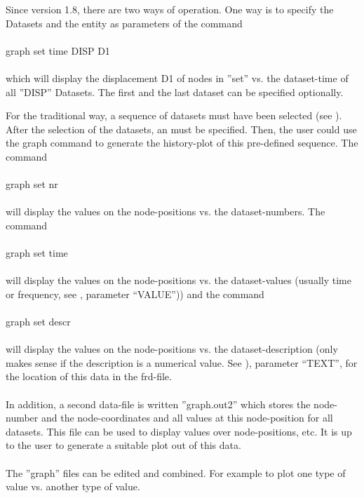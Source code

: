 \documentclass{article}
\begin{document}
Since version 1.8, there are two ways of operation. One way is to specify the Datasets and the entity as parameters of the command\\\\graph set time DISP D1\\\\which will display the displacement D1 of nodes in ''set'' vs. the dataset-time of all ''DISP'' Datasets. The first and the last dataset can be specified optionally.

For the traditional way, a sequence of datasets must have been selected (see  ). After the selection of the datasets, an  must be specified. Then, the user could use the graph command to generate the history-plot of this pre-defined sequence. The command\\\\graph set nr\\\\will display the values on the node-positions vs. the dataset-numbers. The command\\\\graph set time\\\\will display the values on the node-positions vs. the dataset-values (usually time or frequency, see , parameter ``VALUE'')) and the command\\\\graph set descr\\\\will display the values on the node-positions vs. the dataset-description (only makes sense if the description is a numerical value. See ), parameter ``TEXT'', for the location of this data in the frd-file.\\\\In addition, a second data-file is written ''graph.out2'' which stores the node-number and the node-coordinates and all values at this node-position for all datasets. This file can be used to display values over node-positions, etc. It is up to the user to generate a suitable plot out of this data.\\\\The ''graph'' files can be edited and combined. For example to plot one type of value vs. another type of value.\\\\
\end{document}
